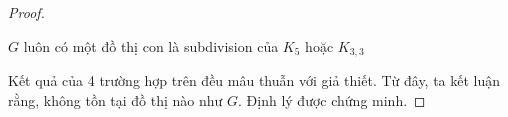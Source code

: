 \begin{proof}
\begin{figure}[H]
\begin{minipage}{0.4\textwidth}
\begin{tikzpicture}[scale = 0.8]
            \end{tikzpicture}
        \end{minipage}
    \end{figure}
    \begin{remark}
        $G$ luôn có một đồ thị con là  subdivision của $K_5$ hoặc $K_{3,3}$
    \end{remark}
    Kết quả của 4 trường hợp trên đều mâu thuẫn với giả thiết. Từ đây, ta kết luận rằng, không tồn tại đồ thị nào như $G$. Định lý được chứng minh.
\end{proof}
